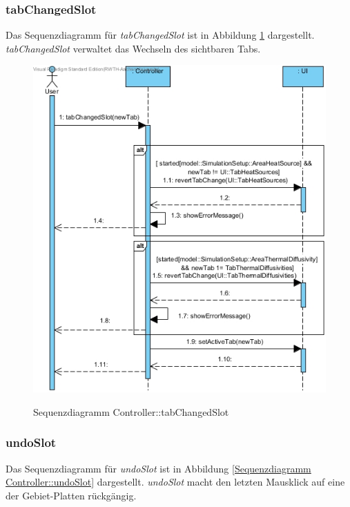 \subsubsection*{tabChangedSlot}

Das Sequenzdiagramm für \emph{tabChangedSlot} ist in Abbildung \ref{Sequenzdiagramm Controller::tabChangedSlot} dargestellt. \emph{tabChangedSlot} verwaltet das Wechseln des sichtbaren Tabs.

\begin{figure}[H]
	\centering
	\includegraphics[scale=.6]{Bilder/Controller__tabChangedSlot().jpg}\\
	\caption{Sequenzdiagramm Controller::tabChangedSlot}
	\label{Sequenzdiagramm Controller::tabChangedSlot}
\end{figure}

\subsubsection*{undoSlot}

Das Sequenzdiagramm für \emph{undoSlot} ist in Abbildung \ref{Sequenzdiagramm Controller::undoSlot} dargestellt. \emph{undoSlot} macht den letzten Mausklick auf eine der Gebiet-Platten rückgängig.

